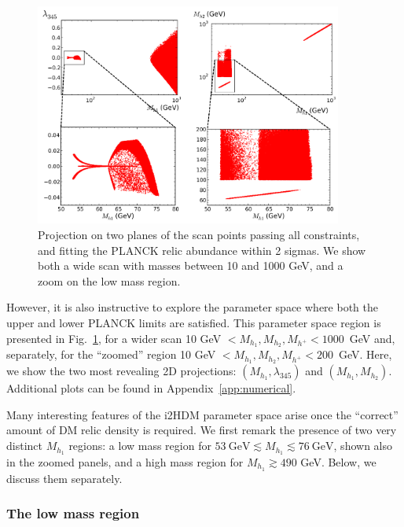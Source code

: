 \documentclass[12pt,a4paper]{article}
\begin{document}
\begin{figure}[htb]
\begin{center}
\includegraphics[width=0.9\textwidth]{simplified-fitting.png}
\caption{Projection on two planes of the scan points passing all constraints, and fitting the PLANCK relic abundance within 2 sigmas. We show both a wide scan with masses between 10 and 1000 GeV, and a zoom on the low mass region.  \label{fig:scan-simplified-fitting}} 
\end{center}
\end{figure}

However, it is also instructive to explore the parameter space where both
the upper and lower PLANCK limits are satisfied.
This parameter space region is presented in Fig.~\ref{fig:scan-simplified-fitting},
for a wider scan 10 GeV $< M_{h_1}, M_{h_2}, M_{h^{+}} < 1000$~GeV and, separately,
for the ``zoomed'' region 10 GeV $< M_{h_1}, M_{h_2}, M_{h^{+}} < 200$~GeV.
Here, we show the two most revealing 2D projections: $(M_{h_1},\lambda_{345})$ and $(M_{h_1},M_{h_2})$. 
Additional plots can be found in Appendix~\ref{app:numerical}.

Many interesting features of the i2HDM parameter space arise once the ``correct'' amount of DM relic density is required. 
We first remark the presence of two very distinct $M_{h_1}$ regions:  
a low mass region for $53~\mbox{GeV} \lesssim M_{h_1} \lesssim 76~\mbox{GeV}$, shown also in the zoomed panels,
and a high mass region for $M_{h_1}\gtrsim 490$ GeV. Below, we discuss them separately.

\subsubsection{The low mass region}
\end{document}
